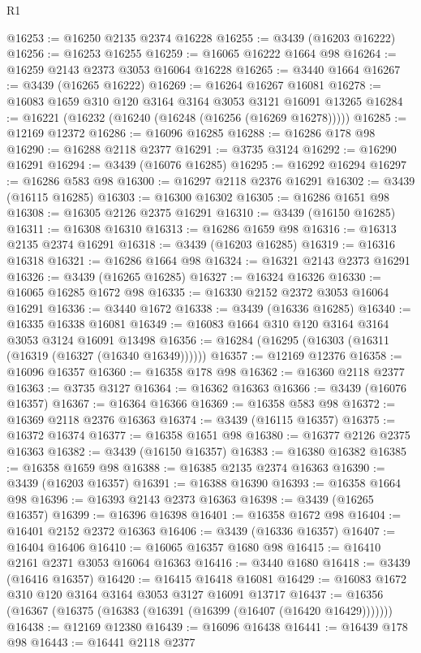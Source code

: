 \begin{lexlean}{R1}
\begin{coremodule}
@16253 := @16250 @2135 @2374 @16228
@16255 := @3439 (@16203 @16222)
@16256 := @16253 @16255
@16259 := @16065 @16222 @1664 @98
@16264 := @16259 @2143 @2373 @3053 @16064 @16228
@16265 := @3440 @1664
@16267 := @3439 (@16265 @16222)
@16269 := @16264 @16267 @16081
@16278 := @16083 @1659 @310 @120 @3164 @3164 @3053 @3121 @16091 @13265
@16284 := @16221 (@16232 (@16240 (@16248 (@16256 (@16269 @16278)))))
@16285 := @12169 @12372
@16286 := @16096 @16285
@16288 := @16286 @178 @98
@16290 := @16288 @2118 @2377
@16291 := @3735 @3124
@16292 := @16290 @16291
@16294 := @3439 (@16076 @16285)
@16295 := @16292 @16294
@16297 := @16286 @583 @98
@16300 := @16297 @2118 @2376 @16291
@16302 := @3439 (@16115 @16285)
@16303 := @16300 @16302
@16305 := @16286 @1651 @98
@16308 := @16305 @2126 @2375 @16291
@16310 := @3439 (@16150 @16285)
@16311 := @16308 @16310
@16313 := @16286 @1659 @98
@16316 := @16313 @2135 @2374 @16291
@16318 := @3439 (@16203 @16285)
@16319 := @16316 @16318
@16321 := @16286 @1664 @98
@16324 := @16321 @2143 @2373 @16291
@16326 := @3439 (@16265 @16285)
@16327 := @16324 @16326
@16330 := @16065 @16285 @1672 @98
@16335 := @16330 @2152 @2372 @3053 @16064 @16291
@16336 := @3440 @1672
@16338 := @3439 (@16336 @16285)
@16340 := @16335 @16338 @16081
@16349 := @16083 @1664 @310 @120 @3164 @3164 @3053 @3124 @16091 @13498
@16356 := @16284 (@16295 (@16303 (@16311 (@16319 (@16327 (@16340 @16349))))))
@16357 := @12169 @12376
@16358 := @16096 @16357
@16360 := @16358 @178 @98
@16362 := @16360 @2118 @2377
@16363 := @3735 @3127
@16364 := @16362 @16363
@16366 := @3439 (@16076 @16357)
@16367 := @16364 @16366
@16369 := @16358 @583 @98
@16372 := @16369 @2118 @2376 @16363
@16374 := @3439 (@16115 @16357)
@16375 := @16372 @16374
@16377 := @16358 @1651 @98
@16380 := @16377 @2126 @2375 @16363
@16382 := @3439 (@16150 @16357)
@16383 := @16380 @16382
@16385 := @16358 @1659 @98
@16388 := @16385 @2135 @2374 @16363
@16390 := @3439 (@16203 @16357)
@16391 := @16388 @16390
@16393 := @16358 @1664 @98
@16396 := @16393 @2143 @2373 @16363
@16398 := @3439 (@16265 @16357)
@16399 := @16396 @16398
@16401 := @16358 @1672 @98
@16404 := @16401 @2152 @2372 @16363
@16406 := @3439 (@16336 @16357)
@16407 := @16404 @16406
@16410 := @16065 @16357 @1680 @98
@16415 := @16410 @2161 @2371 @3053 @16064 @16363
@16416 := @3440 @1680
@16418 := @3439 (@16416 @16357)
@16420 := @16415 @16418 @16081
@16429 := @16083 @1672 @310 @120 @3164 @3164 @3053 @3127 @16091 @13717
@16437 := @16356 (@16367 (@16375 (@16383 (@16391 (@16399 (@16407 (@16420 @16429)))))))
@16438 := @12169 @12380
@16439 := @16096 @16438
@16441 := @16439 @178 @98
@16443 := @16441 @2118 @2377

\end{coremodule}
\end{lexlean}
